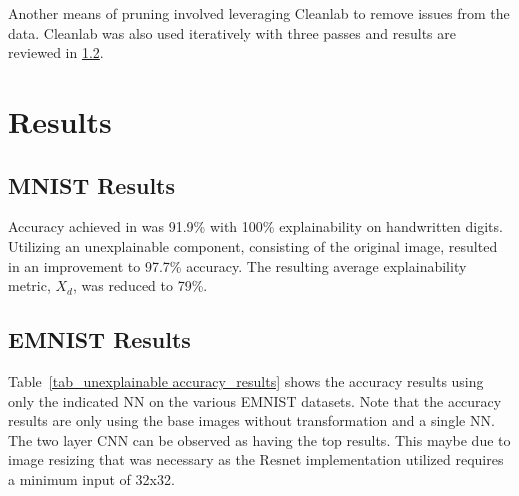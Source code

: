 \documentclass[conference]{IEEEtran}
\begin{document}
Another means of pruning involved leveraging Cleanlab to remove issues from the data.
Cleanlab was also used iteratively with three passes and results are reviewed in
\ref{emnist_results}.

\section{Results}

\subsection{MNIST Results}

Accuracy achieved in \cite{whitten21} was 91.9\% with 100\% explainability on
handwritten digits. Utilizing an unexplainable component, consisting of the
original image, resulted in an improvement to 97.7\% accuracy.  The resulting
average explainability metric, $X_d$, was reduced to 79\%.



\subsection{EMNIST Results}
\label{emnist_results}

Table~\ref{tab_unexplainable accuracy_results} shows the accuracy results using
only the indicated NN on the various EMNIST datasets.  Note that the accuracy
results are only using the base images without transformation and a single NN.
The two layer CNN can be observed as having the top results.  This maybe due to
image resizing that was necessary as the Resnet implementation utilized requires
a minimum input of 32x32.  
\end{document}
